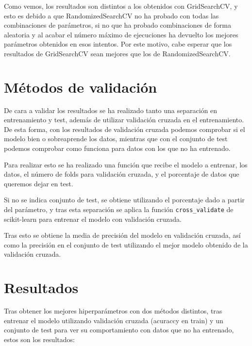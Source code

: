 Como vemos, los resultados son distintos a los obtenidos con GridSearchCV, y esto es debido a que RandomizedSearchCV no ha probado con todas las combinaciones de parámetros, si no que ha probado combinaciones de forma aleatoria y al acabar el número máximo de ejecuciones ha devuelto los mejores parámetros obtenidos en esos intentos. Por este motivo, cabe esperar que los resultados de GridSearchCV sean mejores que los de RandomizedSearchCV.


\section{Métodos de validación}

De cara a validar los resultados se ha realizado tanto una separación en entrenamiento y test, además de utilizar validación cruzada en el entrenamiento. De esta forma, con los resultados de validación cruzada podemos comprobar si el modelo bien o sobreaprende los datos, mientras que con el conjunto de test podemos comprobar como funciona para datos con los que no ha entrenado.

Para realizar esto se ha realizado una función que recibe el modelo a entrenar, los datos, el número de folds para validación cruzada, y el porcentaje de datos que queremos dejar en test.

Si no se indica conjunto de test, se obtiene utilizando el porcentaje dado a partir del parámetro, y tras esta separación se aplica la función \texttt{cross\_validate} de scikit-learn para entrenar el modelo con validación cruzada.

Tras esto se obtiene la media de precisión del modelo en validación cruzada, así como la precisión en el conjunto de test utilizando el mejor modelo obtenido de la validación cruzada.

\section{Resultados}

Tras obtener los mejores hiperparámetros con dos métodos distintos, tras entrenar el modelo utilizando validación cruzada (acuraccy en train) y un conjunto de test para ver su comportamiento con datos que no ha entrenado, estos son los resultados:

